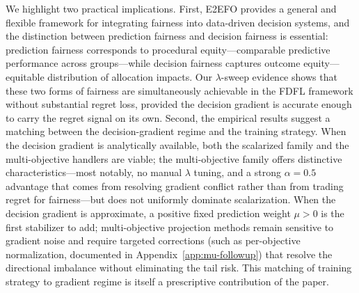We highlight two practical implications. First, E2EFO provides a
general and flexible framework for integrating fairness into
data-driven decision systems, and the distinction between prediction
fairness and decision fairness is essential: prediction fairness
corresponds to procedural equity---comparable predictive performance
across groups---while decision fairness captures outcome equity---equitable
distribution of allocation impacts. Our $\lambda$-sweep evidence shows
that these two forms of fairness are simultaneously achievable in the
FDFL framework without substantial regret loss, provided the decision
gradient is accurate enough to carry the regret signal on its own.
Second, the empirical results suggest a matching between the
decision-gradient regime and the training strategy. When the decision
gradient is analytically available, both the scalarized family and
the multi-objective handlers are viable; the multi-objective family
offers distinctive characteristics---most notably, no manual $\lambda$
tuning, and a strong $\alpha = 0.5$ advantage that comes from
resolving gradient conflict rather than from trading regret for
fairness---but does not uniformly dominate scalarization. When the
decision gradient is approximate, a positive fixed prediction weight
$\mu > 0$ is the first stabilizer to add; multi-objective projection
methods remain sensitive to gradient noise and require targeted
corrections (such as per-objective normalization, documented in
Appendix~\ref{app:mu-followup}) that resolve the directional imbalance
without eliminating the tail risk. This matching of training strategy
to gradient regime is itself a prescriptive contribution of the paper.
